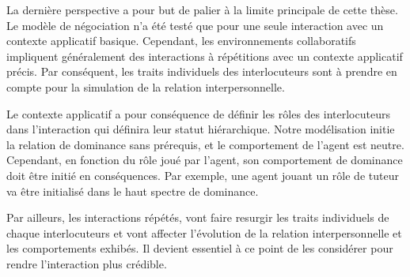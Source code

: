 	La dernière perspective a pour but de palier à la limite principale de cette thèse. Le modèle de négociation n'a été testé que pour une seule interaction avec un contexte applicatif basique. Cependant, les environnements collaboratifs impliquent généralement des interactions à répétitions avec un contexte applicatif précis. Par conséquent, les traits individuels des interlocuteurs sont à prendre en compte pour la simulation de la relation interpersonnelle. 
	
	Le contexte applicatif a pour conséquence de définir les rôles des interlocuteurs dans l'interaction qui définira leur statut hiérarchique. Notre modélisation initie la relation de dominance sans prérequis, et le comportement de l'agent est neutre. Cependant, en fonction du rôle joué par l'agent, son comportement de dominance doit être initié en conséquences. Par exemple, une agent jouant un rôle de tuteur va être initialisé dans le haut spectre de dominance. 
	
	Par ailleurs, les interactions répétés, vont faire resurgir les traits individuels de chaque interlocuteurs et vont affecter l'évolution de la relation interpersonnelle et les comportements exhibés. Il devient essentiel à ce point de les considérer pour rendre l'interaction plus crédible.
	
	
	
	 
	
	
	 
	
	
	